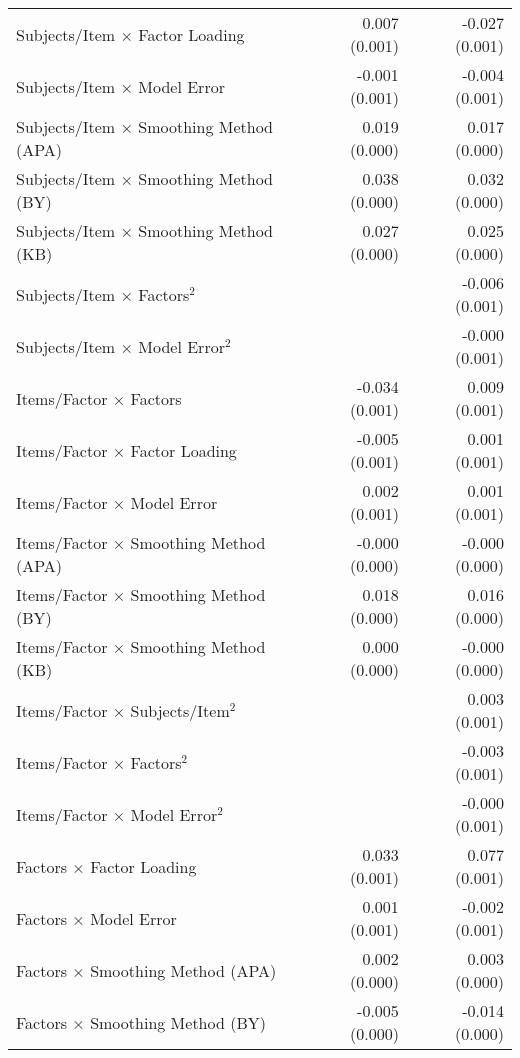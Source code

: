\documentclass[
  english,
  man]{apa6}
\begin{document}
\begin{center}
\begin{longtable}{l D{)}{)}{11)0} D{)}{)}{11)0}}
Subjects/Item $\times$ Factor Loading             & 0.007 \; (0.001)  & -0.027 \; (0.001) \\
Subjects/Item $\times$ Model Error                & -0.001 \; (0.001) & -0.004 \; (0.001) \\
Subjects/Item $\times$ Smoothing Method (APA)     & 0.019 \; (0.000)  & 0.017 \; (0.000)  \\
Subjects/Item $\times$ Smoothing Method (BY)      & 0.038 \; (0.000)  & 0.032 \; (0.000)  \\
Subjects/Item $\times$ Smoothing Method (KB)      & 0.027 \; (0.000)  & 0.025 \; (0.000)  \\
Subjects/Item $\times$ Factors$^2$                &                   & -0.006 \; (0.001) \\
Subjects/Item $\times$ Model Error$^2$            &                   & -0.000 \; (0.001) \\
Items/Factor $\times$ Factors                     & -0.034 \; (0.001) & 0.009 \; (0.001)  \\
Items/Factor $\times$ Factor Loading              & -0.005 \; (0.001) & 0.001 \; (0.001)  \\
Items/Factor $\times$ Model Error                 & 0.002 \; (0.001)  & 0.001 \; (0.001)  \\
Items/Factor $\times$ Smoothing Method (APA)      & -0.000 \; (0.000) & -0.000 \; (0.000) \\
Items/Factor $\times$ Smoothing Method (BY)       & 0.018 \; (0.000)  & 0.016 \; (0.000)  \\
Items/Factor $\times$ Smoothing Method (KB)       & 0.000 \; (0.000)  & -0.000 \; (0.000) \\
Items/Factor $\times$ Subjects/Item$^2$           &                   & 0.003 \; (0.001)  \\
Items/Factor $\times$ Factors$^2$                 &                   & -0.003 \; (0.001) \\
Items/Factor $\times$ Model Error$^2$             &                   & -0.000 \; (0.001) \\
Factors $\times$ Factor Loading                   & 0.033 \; (0.001)  & 0.077 \; (0.001)  \\
Factors $\times$ Model Error                      & 0.001 \; (0.001)  & -0.002 \; (0.001) \\
Factors $\times$ Smoothing Method (APA)           & 0.002 \; (0.000)  & 0.003 \; (0.000)  \\
Factors $\times$ Smoothing Method (BY)            & -0.005 \; (0.000) & -0.014 \; (0.000) \\

\end{longtable}
\end{center}
\end{document}
